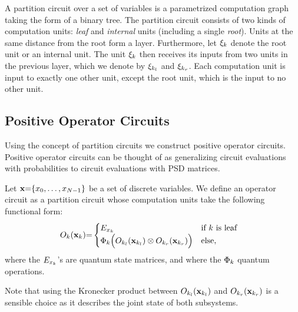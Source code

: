 \begin{definition}
	\label{def:partition_circuit}
	A partition circuit over a set of variables is a parametrized computation graph taking the form of a binary tree. The partition circuit consists of two kinds of computation units:
	\textit{leaf} and \textit{internal} units (including a single \textit{root}).
	Units at the same distance from the root form a layer.
	Furthermore, let $\xi_k$ denote the root unit or an internal unit. The unit $\xi_k$ then receives its inputs from two units in the previous layer, which we denote by $\xi_{k_l}$ and $\xi_{k_r}$. Each computation unit is input to exactly one other unit, except the root unit, which is the input to no other unit.
\end{definition}






\subsection{Positive Operator Circuits}

Using the concept of partition circuits we construct positive operator circuits. Positive operator circuits can be thought of as generalizing circuit evaluations with probabilities to circuit evaluations with PSD matrices.
\begin{definition}
	\label{def:poc}
	Let   $\mathbf{x}{=}\{x_0,\dots ,x_{N{-}1}  \}$ be a set of discrete variables.
	We define an operator circuit as a partition circuit whose computation units take the following functional form:
	\begin{align}
		 & {O}_k(\mathbf{x}_k){=}
		\begin{cases}
			E_{x_k}
			 & \text{if $k$ is leaf}
			\\
			\Phi_k \Bigl(O_{k_l}(\mathbf{x}_{k_l}) \otimes O_{k_r}(\mathbf{x}_{k_r}) \Bigr)
			 & \text{else},
		\end{cases}
		\label{eq:poc:def}
	\end{align}
	where the  $E_{x_k}$'s are quantum state matrices, and where the $\Phi_k$ quantum operations.
\end{definition}
Note that using the Kronecker product between $O_{k_l}(\mathbf{x}_{k_l})$ and  $O_{k_r}(\mathbf{x}_{k_r})$ is a sensible choice as it describes the joint state of both subsystems.


